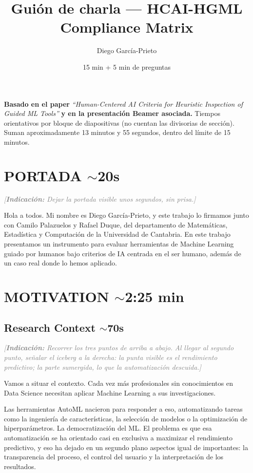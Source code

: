 \documentclass[11pt,a4paper]{article}
\title{\textbf{Guión de charla — HCAI-HGML Compliance Matrix}}
\author{Diego García-Prieto}
\date{15 min + 5 min de preguntas}
\newcommand{\indicacion}[1]{%
    \par\medskip
    \noindent\textcolor{gray}{\textit{[\textbf{Indicaci\'on:} #1]}}
    \par\medskip
}
\begin{document}
\maketitle
\noindent
\textbf{Basado en el paper} \textit{``Human-Centered AI Criteria for Heuristic Inspection of Guided ML Tools''}
\textbf{y en la presentaci\'on Beamer asociada.}
\medskip
\noindent
Tiempos orientativos por bloque de diapositivas (no cuentan las divisorias de secci\'on). Suman aproximadamente 13 minutos y 55 segundos, dentro del límite de 15 minutos.

\section*{PORTADA \hfill \normalfont\small $\sim$20s}
\indicacion{Dejar la portada visible unos segundos, sin prisa.}
Hola a todos. Mi nombre es Diego García-Prieto, y este trabajo lo firmamos junto con Camilo Palazuelos y Rafael Duque, del departamento de Matemáticas, Estadística y Computación de la Universidad de Cantabria. En este trabajo presentamos un instrumento para evaluar herramientas de Machine Learning guiado por humanos bajo criterios de IA centrada en el ser humano, además de un caso real donde lo hemos aplicado.

\section{MOTIVATION \hfill \normalfont\small $\sim$2:25 min}

\subsection{Research Context \hfill \normalfont\small $\sim$70s}
\indicacion{Recorrer los tres puntos de arriba a abajo. Al llegar al segundo punto, señalar el iceberg a la derecha: la punta visible es el rendimiento predictivo; la parte sumergida, lo que la automatización descuida.}
Vamos a situar el contexto. Cada vez más profesionales sin conocimientos en Data Science necesitan aplicar Machine Learning a sus investigaciones.

Las herramientas AutoML nacieron para responder a eso, automatizando tareas como la ingeniería de características, la selección de modelos o la optimización de hiperparámetros. La democratización del ML. El problema es que esa automatización se ha orientado casi en exclusiva a maximizar el rendimiento predictivo, y eso ha dejado en un segundo plano aspectos igual de importantes: la transparencia del proceso, el control del usuario y la interpretación de los resultados.
\end{document}

